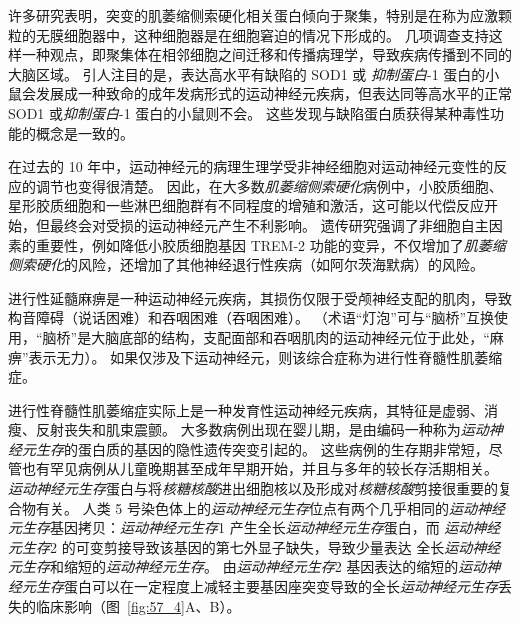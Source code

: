 许多研究表明，突变的肌萎缩侧索硬化相关蛋白倾向于聚集，特别是在称为应激颗粒的无膜细胞器中，这种细胞器是在细胞窘迫的情况下形成的。
几项调查支持这样一种观点，即聚集体在相邻细胞之间迁移和传播病理学，导致疾病传播到不同的大脑区域。
引人注目的是，表达高水平有缺陷的 SOD1 或 \textit{抑制蛋白}-1 蛋白的小鼠会发展成一种致命的成年发病形式的运动神经元疾病，但表达同等高水平的正常 SOD1 或\textit{抑制蛋白}-1 蛋白的小鼠则不会。
这些发现与缺陷蛋白质获得某种毒性功能的概念是一致的。


在过去的 10 年中，运动神经元的病理生理学受非神经细胞对运动神经元变性的反应的调节也变得很清楚。
因此，在大多数\textit{肌萎缩侧索硬化}病例中，小胶质细胞、星形胶质细胞和一些淋巴细胞群有不同程度的增殖和激活，这可能以代偿反应开始，但最终会对受损的运动神经元产生不利影响。
遗传研究强调了非细胞自主因素的重要性，例如降低小胶质细胞基因 TREM-2 功能的变异，不仅增加了\textit{肌萎缩侧索硬化}的风险，还增加了其他神经退行性疾病（如阿尔茨海默病）的风险。


进行性延髓麻痹是一种运动神经元疾病，其损伤仅限于受颅神经支配的肌肉，导致构音障碍（说话困难）和吞咽困难（吞咽困难）。 
（术语“灯泡”可与“脑桥”互换使用，“脑桥”是大脑底部的结构，支配面部和吞咽肌肉的运动神经元位于此处，“麻痹”表示无力）。
如果仅涉及下运动神经元，则该综合症称为进行性脊髓性肌萎缩症。


进行性脊髓性肌萎缩症实际上是一种发育性运动神经元疾病，其特征是虚弱、消瘦、反射丧失和肌束震颤。
大多数病例出现在婴儿期，是由编码一种称为\textit{运动神经元生存}的蛋白质的基因的隐性遗传突变引起的。
这些病例的生存期非常短，尽管也有罕见病例从儿童晚期甚至成年早期开始，并且与多年的较长存活期相关。
\textit{运动神经元生存}蛋白与将\textit{核糖核酸}进出细胞核以及形成对\textit{核糖核酸}剪接很重要的复合物有关。
人类 5 号染色体上的\textit{运动神经元生存}位点有两个几乎相同的\textit{运动神经元生存}基因拷贝：\textit{运动神经元生存}1 产生全长\textit{运动神经元生存}蛋白，而 \textit{运动神经元生存}2 的可变剪接导致该基因的第七外显子缺失，导致少量表达 全长\textit{运动神经元生存}和缩短的\textit{运动神经元生存}。
由\textit{运动神经元生存}2 基因表达的缩短的\textit{运动神经元生存}蛋白可以在一定程度上减轻主要基因座突变导致的全长\textit{运动神经元生存}丢失的临床影响（图~\ref{fig:57_4}A、B）。


